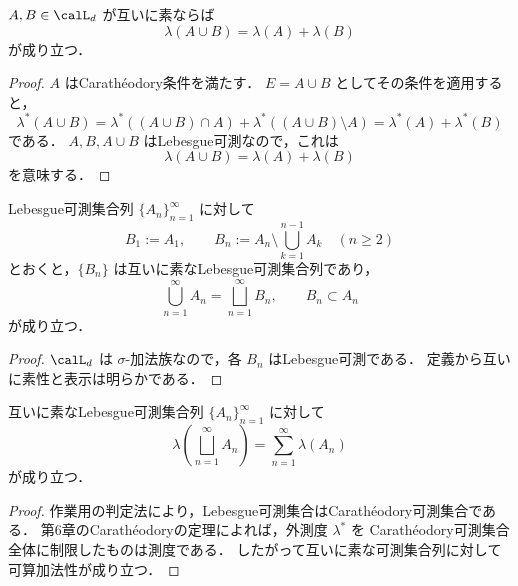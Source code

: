 \begin{lemma}[有限加法性]
$A,B\in\calL_d$ が互いに素ならば
\[
\lambda(A\cup B)=\lambda(A)+\lambda(B)
\]
が成り立つ．
\end{lemma}
\begin{proof}
$A$ はCarathéodory条件を満たす．
$E=A\cup B$ としてその条件を適用すると，
\[
\lambda^*(A\cup B)
=
\lambda^*((A\cup B)\cap A)+\lambda^*((A\cup B)\setminus A)
=
\lambda^*(A)+\lambda^*(B)
\]
である．
$A,B,A\cup B$ はLebesgue可測なので，これは
\[
\lambda(A\cup B)=\lambda(A)+\lambda(B)
\]
を意味する．
\end{proof}

\begin{lemma}[互いに素な列への分解]
Lebesgue可測集合列 $\{A_n\}_{n=1}^{\infty}$ に対して
\[
B_1:=A_1,\qquad
B_n:=A_n\setminus\bigcup_{k=1}^{n-1}A_k\quad(n\ge2)
\]
とおくと，$\{B_n\}$ は互いに素なLebesgue可測集合列であり，
\[
\bigcup_{n=1}^{\infty}A_n=\bigsqcup_{n=1}^{\infty}B_n,
\qquad
B_n\subset A_n
\]
が成り立つ．
\end{lemma}
\begin{proof}
$\calL_d$ は $\sigma$-加法族なので，各 $B_n$ はLebesgue可測である．
定義から互いに素性と表示は明らかである．
\end{proof}

\begin{theorem}[完全加法性]
互いに素なLebesgue可測集合列 $\{A_n\}_{n=1}^{\infty}$ に対して
\[
\lambda\left(\bigsqcup_{n=1}^{\infty}A_n\right)
=
\sum_{n=1}^{\infty}\lambda(A_n)
\]
が成り立つ．
\end{theorem}
\begin{proof}
作業用の判定法により，Lebesgue可測集合はCarathéodory可測集合である．
第6章のCarathéodoryの定理によれば，外測度 $\lambda^*$ を
Carathéodory可測集合全体に制限したものは測度である．
したがって互いに素な可測集合列に対して可算加法性が成り立つ．
\end{proof}

